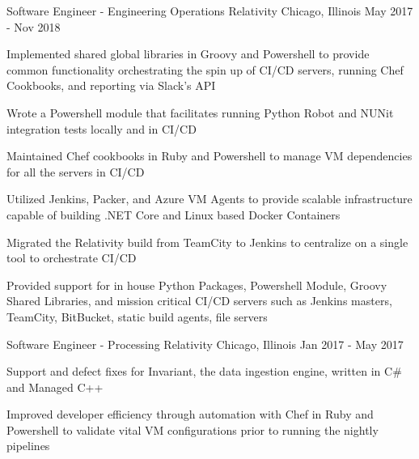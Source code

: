 
\begin{cventries}

  \cventry
    {Software Engineer - Engineering Operations} %
    {Relativity} %
    {Chicago, Illinois} %
    {May 2017 - Nov 2018} %
    {
      \begin{cvitems} %
        \item {Implemented shared global libraries in Groovy and Powershell to provide common functionality orchestrating the spin up of CI/CD servers, running Chef Cookbooks, and reporting via Slack's API}
        \item {Wrote a Powershell module that facilitates running Python Robot and NUNit integration tests locally and in CI/CD}
        \item {Maintained Chef cookbooks in Ruby and Powershell to manage VM dependencies for all the servers in CI/CD}
        \item {Utilized Jenkins, Packer, and Azure VM Agents to provide scalable infrastructure capable of building .NET Core and Linux based Docker Containers}
        \item {Migrated the Relativity build from TeamCity to Jenkins to centralize on a single tool to orchestrate CI/CD}
        \item {Provided support for in house Python Packages, Powershell Module, Groovy Shared Libraries, and mission critical CI/CD servers such as Jenkins masters, TeamCity, BitBucket, static build agents, file servers}
      \end{cvitems}
    }
    
  \cventry
    {Software Engineer - Processing} %
    {Relativity} %
    {Chicago, Illinois} %
    {Jan 2017 - May 2017} %
    {
      \begin{cvitems} %
        \item {Support and defect fixes for Invariant, the data ingestion engine, written in C\# and Managed C++}
        \item {Improved developer efficiency through automation with Chef in Ruby and Powershell to validate vital VM configurations prior to running the nightly pipelines}
      \end{cvitems}
    }

    
\end{cventries}